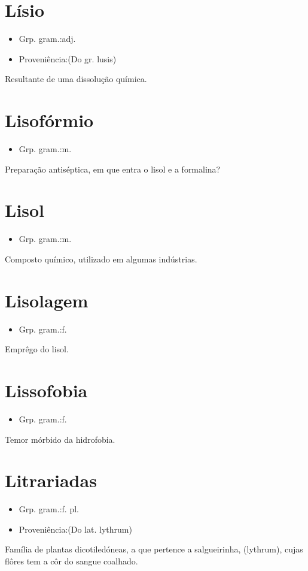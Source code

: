 \section{Lísio}
\begin{itemize}
\item {Grp. gram.:adj.}
\end{itemize}
\begin{itemize}
\item {Proveniência:(Do gr. \textunderscore lusis\textunderscore )}
\end{itemize}
Resultante de uma dissolução química.
\section{Lisofórmio}
\begin{itemize}
\item {Grp. gram.:m.}
\end{itemize}
Preparação antiséptica, em que entra o lisol e a formalina?
\section{Lisol}
\begin{itemize}
\item {Grp. gram.:m.}
\end{itemize}
Composto químico, utilizado em algumas indústrias.
\section{Lisolagem}
\begin{itemize}
\item {Grp. gram.:f.}
\end{itemize}
Emprêgo do lisol.
\section{Lissofobia}
\begin{itemize}
\item {Grp. gram.:f.}
\end{itemize}
Temor mórbido da hidrofobia.
\section{Litrariadas}
\begin{itemize}
\item {Grp. gram.:f. pl.}
\end{itemize}
\begin{itemize}
\item {Proveniência:(Do lat. \textunderscore lythrum\textunderscore )}
\end{itemize}
Família de plantas dicotiledóneas, a que pertence a salgueirinha, (\textunderscore lythrum\textunderscore ), cujas flôres tem a côr do sangue coalhado.
